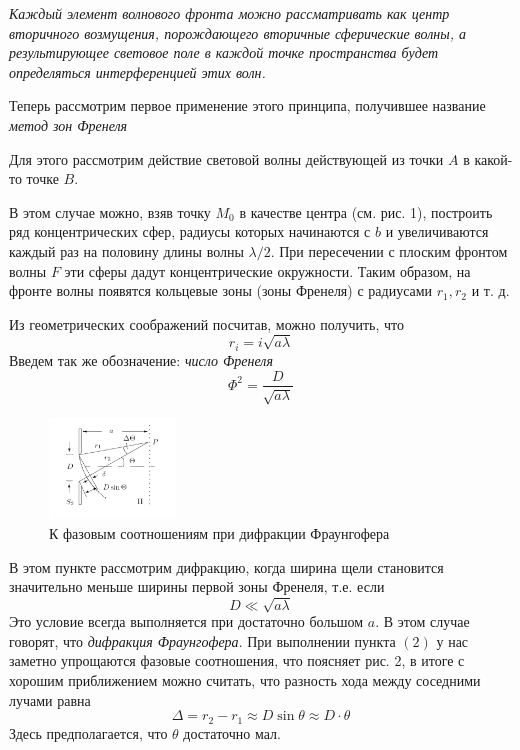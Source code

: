 \documentclass[a4paper, 12pt]{article}%
\begin{document}
\textit{Каждый элемент волнового фронта можно рассматривать как центр  вторичного возмущения, порождающего вторичные сферические волны, а результирующее световое поле  в каждой точке пространства будет определяться интерференцией этих волн.}

Теперь рассмотрим первое применение этого принципа, получившее название \textit{метод зон Френеля}

Для этого рассмотрим действие световой волны действующей из точки $A$ в какой-то точке $B$.

В этом случае можно, взяв точку $M_0$ в качестве центра (см. рис. 1), построить ряд концентрических сфер, радиусы которых начинаются с $b$ и увеличиваются каждый раз на половину длины волны $\lambda/2$. При пересечении с плоским фронтом волны $F$ эти сферы дадут концентрические окружности. Таким образом, на фронте волны появятся кольцевые зоны (зоны Френеля) с радиусами $r_1, r_2$ и т. д.

Из геометрических соображений посчитав, можно получить, что 
\begin{equation}
r_i = i \sqrt{a \lambda}
\end{equation}	
Введем так же обозначение: \textit{число Френеля}
\begin{equation}
\Phi^2 = \dfrac{D}{\sqrt{a\lambda}}
\end{equation}
\begin{figure}
  \begin{center}
    \includegraphics[width = 0.3\textwidth]{pics/3.png}
  \end{center}
  \caption{К фазовым соотношениям при дифракции Фраунгофера}
\end{figure}
В этом пункте рассмотрим дифракцию, когда ширина щели становится значительно меньше ширины первой зоны Френеля, т.е. если 
\begin{equation}
D \ll\sqrt{a \lambda} 
\end{equation}	
Это условие всегда выполняется при достаточно большом $a$. В этом случае говорят, что \textit{дифракция Фраунгофера}. При выполнении пункта $(2)$ у нас заметно упрощаются фазовые соотношения, что поясняет рис. 2, в итоге с хорошим приближением можно считать, что разность хода между соседними лучами равна 
\begin{equation}
\Delta = r_2 - r_1 \approx D \sin \theta \approx D \cdot \theta
\end{equation}
Здесь предполагается, что $\theta$ достаточно мал.
\end{document}
